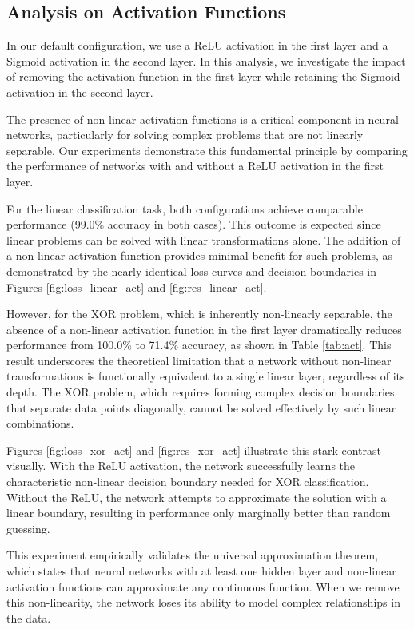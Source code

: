 \documentclass[twocolumn]{extarticle}
\begin{document}
\subsection{Analysis on Activation Functions}
In our default configuration, we use a ReLU activation in the first layer and a Sigmoid activation in the second layer. In this analysis, we investigate the impact of removing the activation function in the first layer while retaining the Sigmoid activation in the second layer.

The presence of non-linear activation functions is a critical component in neural networks, particularly for solving complex problems that are not linearly separable. Our experiments demonstrate this fundamental principle by comparing the performance of networks with and without a ReLU activation in the first layer.

For the linear classification task, both configurations achieve comparable performance (99.0\% accuracy in both cases). This outcome is expected since linear problems can be solved with linear transformations alone. The addition of a non-linear activation function provides minimal benefit for such problems, as demonstrated by the nearly identical loss curves and decision boundaries in Figures \ref{fig:loss_linear_act} and \ref{fig:res_linear_act}.

However, for the XOR problem, which is inherently non-linearly separable, the absence of a non-linear activation function in the first layer dramatically reduces performance from 100.0\% to 71.4\% accuracy, as shown in Table \ref{tab:act}. This result underscores the theoretical limitation that a network without non-linear transformations is functionally equivalent to a single linear layer, regardless of its depth. The XOR problem, which requires forming complex decision boundaries that separate data points diagonally, cannot be solved effectively by such linear combinations.

Figures \ref{fig:loss_xor_act} and \ref{fig:res_xor_act} illustrate this stark contrast visually. With the ReLU activation, the network successfully learns the characteristic non-linear decision boundary needed for XOR classification. Without the ReLU, the network attempts to approximate the solution with a linear boundary, resulting in performance only marginally better than random guessing.

This experiment empirically validates the universal approximation theorem, which states that neural networks with at least one hidden layer and non-linear activation functions can approximate any continuous function. When we remove this non-linearity, the network loses its ability to model complex relationships in the data.
\end{document}
